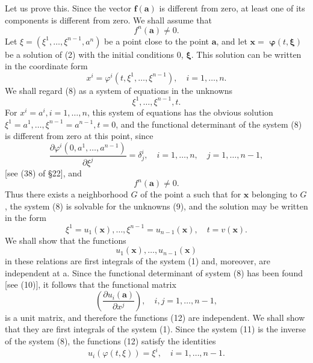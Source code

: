 \documentclass[10pt,a5paper]{book}
\theoremstyle{plain}
\theoremstyle{definition}
\theoremstyle{remark}
\begin{document}
Let us prove this. Since the vector $\mathbf{f}(\mathbf{a})$ is different from zero, at least one of its components is different from zero. We shall assume that
\[
f^{n}(\mathbf{a}) \neq 0 .
\]
Let $\xi=\left(\xi^{1}, \ldots, \xi^{n-1}, a^{n}\right)$ be a point close to the point $\mathbf{a}$, and let $\mathbf{x}=$ $\boldsymbol{\varphi}(t, \boldsymbol{\xi})$ be a solution of (2) with the initial conditions 0, $\boldsymbol{\xi}$. This solution can be written in the coordinate form
\begin{equation*}
x^{i}=\varphi^{i}\left(t, \xi^{1}, \ldots, \xi^{n-1}\right), \quad i=1, \ldots, n . \tag{8}
\end{equation*}
We shall regard (8) as a system of equations in the unknowns
\begin{equation*}
\xi^{1}, \ldots, \xi^{n-1}, t . \tag{9}
\end{equation*}
For $x^{i}=a^{i}, i=1, \ldots, n$, this system of equations has the obvious
solution $\xi^{1}=a^{1}, \ldots, \xi^{n-1}=a^{n-1}, t=0$, and the functional determinant of the system (8) is different from zero at this point, since
\begin{equation*}
\frac{\partial \varphi^{i}\left(0, a^{1}, \ldots, a^{n-1}\right)}{\partial \xi^{j}}=\delta_{j}^{i}, \quad i=1, \ldots, n, \quad j=1, \ldots, n-1, \tag{10}
\end{equation*}
[see (38) of §22], and
\[
f^{n}(\mathbf{a}) \neq 0 .
\]
Thus there exists a neighborhood $G$ of the point a such that for $\mathbf{x}$ belonging to $G$, the system (8) is solvable for the unknowns (9), and the solution may be written in the form
\begin{equation*}
\xi^{1}=u_{1}(\mathbf{x}), \ldots, \xi^{n-1}=u_{n-1}(\mathbf{x}), \quad t=v(\mathbf{x}) . \tag{11}
\end{equation*}
We shall show that the functions
\begin{equation*}
u_{1}(\mathbf{x}), \ldots, u_{n-1}(\mathbf{x}) \tag{12}
\end{equation*}
in these relations are first integrals of the system (1) and, moreover, are independent at a. Since the functional determinant of system (8) has been found [see (10)], it follows that the functional matrix
\[
\left(\frac{\partial u_{i}(\mathbf{a})}{\partial x^{j}}\right), \quad i, j=1, \ldots, n-1,
\]
is a unit matrix, and therefore the functions (12) are independent. We shall show that they are first integrals of the system (1). Since the system (11) is the inverse of the system (8), the functions (12) satisfy the identities
\begin{equation*}
u_{i}(\varphi(t, \xi))=\xi^{i}, \quad i=1, \ldots, n-1 . \tag{13}
\end{equation*}
\end{document}
